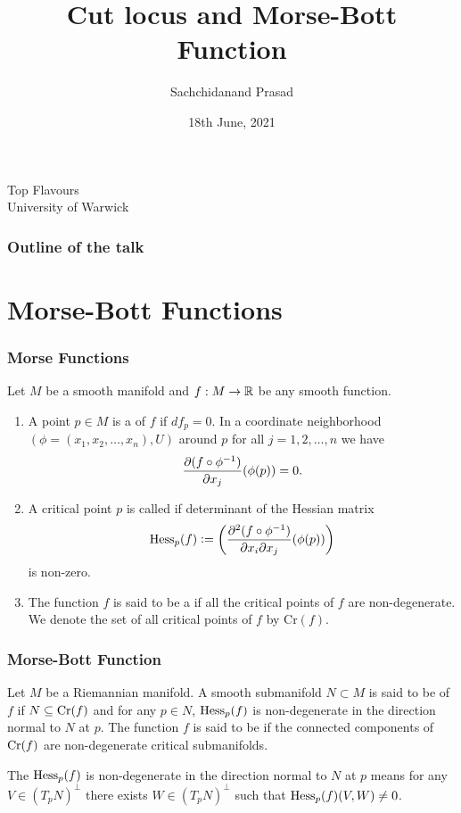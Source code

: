 \documentclass{beamer}
\title{Cut locus and Morse-Bott Function}
\author{Sachchidanand Prasad}
\institute{\small Indian Institute of Science Education and Research, Kolkata, India}
\date{18th June, 2021}
\begin{document}
	\titlepage
	\vspace{0.1cm}
	\begin{center}
		\Large \textcolor[rgb]{0.4,0,0.5}{Top Flavours \\
		\noindent University of Warwick}
	\end{center}

	\begin{frame}
		\frametitle<presentation>{Outline of the talk}
		\tableofcontents
	\end{frame}	

	\section{Morse-Bott Functions}
	\begin{frame}
		\frametitle<presentation>{Morse Functions}
		\p Let $M$ be a smooth manifold and $f:M\to \mathbb{R}$  be any smooth function.
		\begin{enumerate}
			\p \item A point $p\in M$ is a \emph{} of $f$ if $df_p = 0$. \p In a coordinate neighborhood $(\phi=(x_1,x_2,\ldots,x_n),U)$ around $p$ for all $j=1,2,\ldots,n$ we have 
			\begin{displaymath}
			\dfrac{\partial(f\circ \phi^{-1})}{\partial x_j}(\phi(p))=0. 
			\end{displaymath}
			\p \item A critical point $p$ is called {\emph{}} \p if determinant of the Hessian matrix
			\begin{displaymath}
			\mathrm{Hess}_p(f) \vcentcolon= \left(\dfrac{\partial^2(f\circ \phi^{-1})}{\partial x_i\partial x_j}(\phi(p))\right)
			\end{displaymath}
			is non-zero. 
			\p \item The function $f$ is said to be a \emph{} if all the critical points of $f$ are non-degenerate. \p We denote the set of all critical points of $f$ by $\mathrm{Cr}(f)$.
		\end{enumerate}
	\end{frame}	

	\begin{frame}
		\frametitle<presentation>{Morse-Bott Function}
		
		\p\begin{definition}
			\p Let $M$ be a Riemannian manifold. A smooth submanifold $ N\subset M $ is said to be {\emph{}} of $f$ if $N\subseteq \mathrm{Cr}(f)$ \p and for any $p\in N$, $\mathrm{Hess}_{p}(f)$ is \alert<6>{non-degenerate in the direction normal to $N$ at $p$}. \p[7] The function $f$ is said to be {\emph{}} if the connected components of $ \mathrm{Cr}(f) $ are non-degenerate critical submanifolds.
		\end{definition}
		\p[6] The $\mathrm{Hess}_p(f)$ is \alert<6>{non-degenerate in the direction normal to $N$ at $p$} means for any $V\in (T_pN)^\perp$ there exists $W\in  (T_pN)^\perp$ such that $\mathrm{Hess}_p(f)(V,W)\neq 0$.
	\end{frame}	
\end{document}
